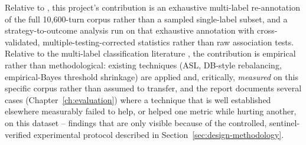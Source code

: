 Relative to \citet{wang2019persuasion}, this project's contribution is an
exhaustive multi-label re-annotation of the full 10{,}600-turn corpus rather
than a sampled single-label subset, and a strategy-to-outcome analysis run on
that exhaustive annotation with cross-validated, multiple-testing-corrected
statistics rather than raw association tests. Relative to the multi-label
classification literature \citep{benbaruch2021asl, wu2020distribution}, the
contribution is empirical rather than methodological: existing techniques
(ASL, DB-style rebalancing, empirical-Bayes threshold shrinkage) are applied
and, critically, \emph{measured} on this specific corpus rather than assumed
to transfer, and the report documents several cases (Chapter~\ref{ch:evaluation})
where a technique that is well established elsewhere measurably failed to
help, or helped one metric while hurting another, on this dataset --
findings that are only visible because of the controlled, sentinel-verified
experimental protocol described in Section~\ref{sec:design-methodology}.
